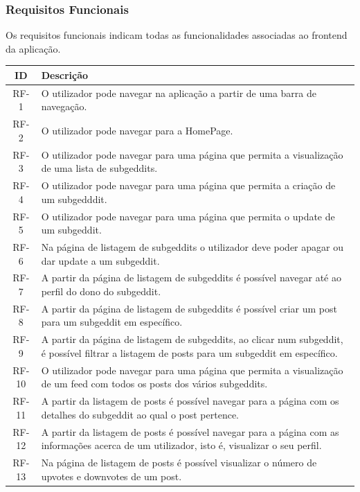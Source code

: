 \documentclass{article}
\begin{document}
	\subsubsection{Requisitos Funcionais}
	Os requisitos funcionais indicam todas as funcionalidades associadas ao frontend da aplicação.
	\begin{table}[H]
		\centering
		\begin{tabular}{|c|p{14cm}|}
			\hline
			ID & Descrição \\
			\hline
			RF-1 & O utilizador pode navegar na aplicação a partir de uma barra de navegação. \\
			\hline
			RF-2 & O utilizador pode navegar para a HomePage.\\
			\hline
			RF-3 & O utilizador pode navegar para uma página que permita a visualização de uma lista de subgeddits.\\
			\hline
			RF-4 & O utilizador pode navegar para uma página que permita a criação de um subgedddit. \\
			\hline
			RF-5 & O utilizador pode navegar para uma página que permita o update de um subgeddit.\\
			\hline
			RF-6 & Na página de listagem de subgeddits o utilizador deve poder apagar ou dar update a um subgeddit.\\
			\hline
			RF-7 & A partir da página de listagem de subgeddits é possível navegar até ao perfil do dono do subgeddit. \\
			\hline
			RF-8 & A partir da página de listagem de subgeddits é possível criar um post para um subgeddit em específico. \\
			\hline
			RF-9 & A partir da página de listagem de subgeddits, ao clicar num subgeddit, é possível filtrar a listagem de posts para um subgeddit em específico.\\
			\hline
			RF-10 & O utilizador pode navegar para uma página que permita a visualização de um feed com todos os posts dos vários subgeddits.\\
			\hline
			RF-11 & A partir da listagem de posts é possível navegar para a página com os detalhes do subgeddit ao qual o post pertence.\\
			\hline
			RF-12 & A partir da listagem de posts é possível navegar para a página com as informações acerca de um utilizador, isto é, visualizar o seu perfil. \\
			\hline
			RF-13 & Na página de listagem de posts é possível visualizar o número de upvotes e downvotes de um post. \\

\end{tabular}
\end{table}
\end{document}
